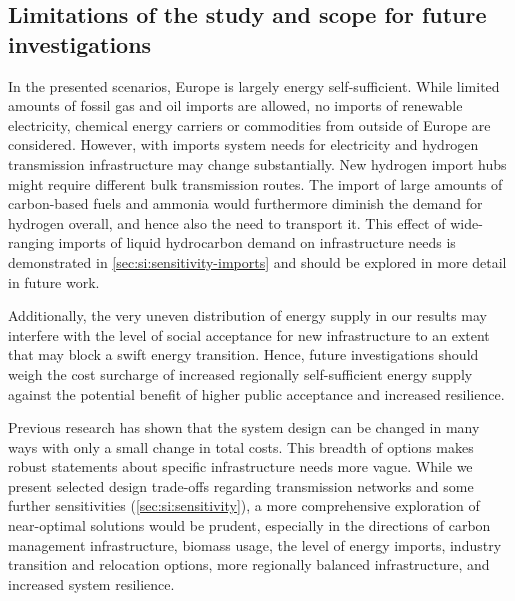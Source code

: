\subsection*{Limitations of the study and scope for future investigations}
\label{sec:limitations}

In the presented scenarios, Europe is largely energy self-sufficient. While
limited amounts of fossil gas and oil imports are allowed, no imports of
renewable electricity, chemical energy carriers or commodities from outside of
Europe are considered. However, with imports system needs for electricity and
hydrogen transmission infrastructure may change substantially. New hydrogen
import hubs might require different bulk transmission routes. The import of
large amounts of carbon-based fuels and ammonia would furthermore diminish the
demand for hydrogen overall, and hence also the need to transport it. This
effect of wide-ranging imports of liquid hydrocarbon demand on infrastructure
needs is demonstrated in \cref{sec:si:sensitivity-imports} and should be
explored in more detail in future work.
\cite{fasihiTechnoeconomicAssessment2019,heuserTechnoeconomicAnalysis2019,hamppImportOptions2021}

Additionally, the very uneven distribution of energy supply in our results may
interfere with the level of social acceptance for new infrastructure to an
extent that may block a swift energy transition.
\cite{sasseDistributionalTradeoffs2019,sasseRegionalImpacts2020} Hence, future
investigations should weigh the cost surcharge of increased regionally
self-sufficient energy supply against the potential benefit of higher public
acceptance and increased resilience.

Previous research has shown that the system design can be changed in many ways
with only a small change in total
costs.\cite{Neumann2019,lombardiPolicyDecision2020,pedersenModelingAll2021,pickeringDiversityOptions2022}
This breadth of options makes robust statements about specific infrastructure
needs more vague. While we present selected design trade-offs regarding
transmission networks and some further sensitivities
(\cref{sec:si:sensitivity}), a more comprehensive exploration of near-optimal
solutions would be prudent, especially in the directions of carbon management
infrastructure, biomass usage, the level of energy imports, industry transition
and relocation options, more regionally balanced infrastructure, and increased
system resilience.

